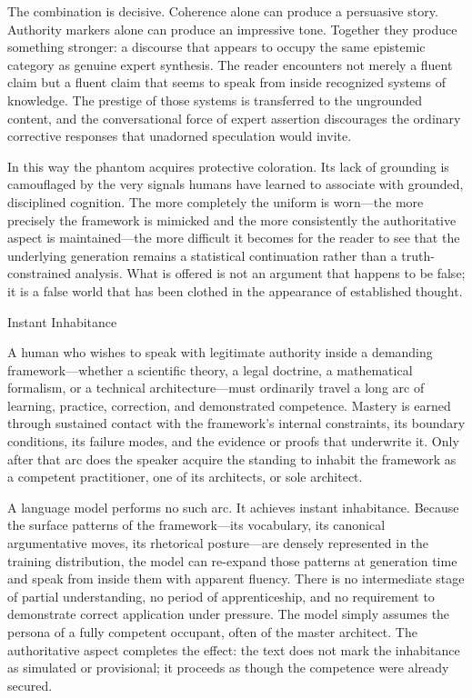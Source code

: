 The combination is decisive. Coherence alone can produce a persuasive story. Authority markers alone can produce an impressive tone. Together they produce something stronger: a discourse that appears to occupy the same epistemic category as genuine expert synthesis. The reader encounters not merely a fluent claim but a fluent claim that seems to speak from inside recognized systems of knowledge. The prestige of those systems is transferred to the ungrounded content, and the conversational force of expert assertion discourages the ordinary corrective responses that unadorned speculation would invite.

In this way the phantom acquires protective coloration. Its lack of grounding is camouflaged by the very signals humans have learned to associate with grounded, disciplined cognition. The more completely the uniform is worn—the more precisely the framework is mimicked and the more consistently the authoritative aspect is maintained—the more difficult it becomes for the reader to see that the underlying generation remains a statistical continuation rather than a truth-constrained analysis. What is offered is not an argument that happens to be false; it is a false world that has been clothed in the appearance of established thought.

Instant Inhabitance

A human who wishes to speak with legitimate authority inside a demanding framework—whether a scientific theory, a legal doctrine, a mathematical formalism, or a technical architecture—must ordinarily travel a long arc of learning, practice, correction, and demonstrated competence. Mastery is earned through sustained contact with the framework’s internal constraints, its boundary conditions, its failure modes, and the evidence or proofs that underwrite it. Only after that arc does the speaker acquire the standing to inhabit the framework as a competent practitioner, one of its architects, or sole architect.

A language model performs no such arc. It achieves instant inhabitance. Because the surface patterns of the framework—its vocabulary, its canonical argumentative moves, its rhetorical posture—are densely represented in the training distribution, the model can re-expand those patterns at generation time and speak from inside them with apparent fluency. There is no intermediate stage of partial understanding, no period of apprenticeship, and no requirement to demonstrate correct application under pressure. The model simply assumes the persona of a fully competent occupant, often of the master architect. The authoritative aspect completes the effect: the text does not mark the inhabitance as simulated or provisional; it proceeds as though the competence were already secured.

